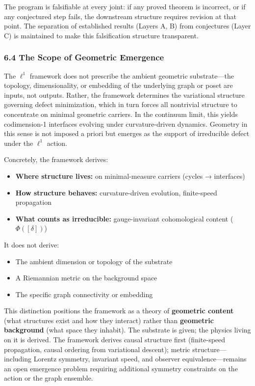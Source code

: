 \documentclass[
]{article}
\providecommand{\tightlist}{%
  \setlength{\itemsep}{0pt}\setlength{\parskip}{0pt}}
\begin{document}
The program is falsifiable at every joint: if any proved theorem is
incorrect, or if any conjectured step fails, the downstream structure
requires revision at that point. The separation of established results
(Layers A, B) from conjectures (Layer C) is maintained to make this
falsification structure transparent.

\subsubsection{6.4 The Scope of Geometric
Emergence}\label{the-scope-of-geometric-emergence}

The \(\ell^1\) framework does not prescribe the ambient geometric
substrate---the topology, dimensionality, or embedding of the underlying
graph or poset are inputs, not outputs. Rather, the framework determines
the variational structure governing defect minimization, which in turn
forces all nontrivial structure to concentrate on minimal geometric
carriers. In the continuum limit, this yields codimension-1 interfaces
evolving under curvature-driven dynamics. Geometry in this sense is not
imposed a priori but emerges as the support of irreducible defect under
the \(\ell^1\) action.

Concretely, the framework derives:

\begin{itemize}
\tightlist
\item
  \textbf{Where structure lives:} on minimal-measure carriers (cycles →
  interfaces)
\item
  \textbf{How structure behaves:} curvature-driven evolution,
  finite-speed propagation
\item
  \textbf{What counts as irreducible:} gauge-invariant cohomological
  content (\(\Phi([\delta])\))
\end{itemize}

It does not derive:

\begin{itemize}
\tightlist
\item
  The ambient dimension or topology of the substrate
\item
  A Riemannian metric on the background space
\item
  The specific graph connectivity or embedding
\end{itemize}

This distinction positions the framework as a theory of
\textbf{geometric content} (what structures exist and how they interact)
rather than \textbf{geometric background} (what space they inhabit). The
substrate is given; the physics living on it is derived. The framework
derives causal structure first (finite-speed propagation, causal
ordering from variational descent); metric structure---including Lorentz
symmetry, invariant speed, and observer equivalence---remains an open
emergence problem requiring additional symmetry constraints on the
action or the graph ensemble.
\end{document}
